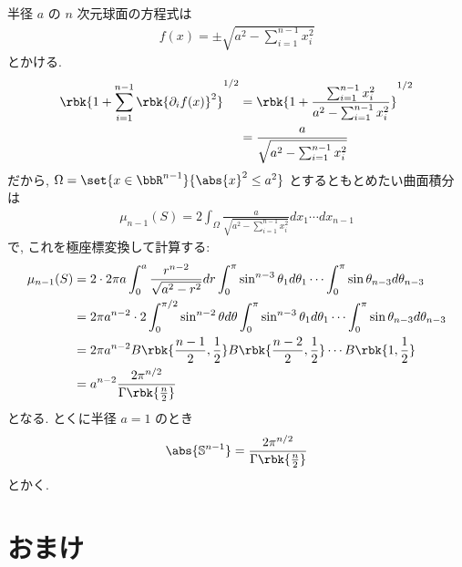 \documentclass[openany, a4paper, oneside]{jsbook}
\begin{document}
半径 $a$ の $n$ 次元球面の方程式は
\begin{align}
 f(x)
 =
 \pm \sqrt{a^2 - \sum_{i=1}^{n-1} x_i^2}
\end{align}
とかける.
\begin{align}
 \rbk{1 + \sum_{i=1}^{n-1} \rbk{\partial_if(x)}^2}^{1/2}
 &=
 \rbk{1 + \frac{\sum_{i=1}^{n-1}x_i^2}{a^2 - \sum_{i=1}^{n-1} x_i^2}}^{1/2} \\
 &=
 \frac{a}{\sqrt{a^2 - \sum_{i=1}^{n-1} x_i^2}}
\end{align}
だから, $\Omega = \set{x \in \bbR^{n-1}}{\abs{x}^2 \le a^2}$ とするともとめたい曲面積分は
\begin{align}
 \mu_{n-1}(S)
 =
 2\int_{\Omega}
  \frac{a}{\sqrt{a^2 - \sum_{i=1}^{n-1} x_i^2}} dx_1 \cdots dx_{n-1}
\end{align}
で, これを極座標変換して計算する:
\begin{align}
 \mu_{n-1}(S)
 &=
 2 \cdot 2\pi a\int_0^a\frac{r^{n-2}}{\sqrt{a^2 - r^2}} dr
 \int_0^{\pi}\sin^{n-3}\theta_1d\theta_1
  \cdots \int_0^{\pi}\sin\theta_{n-3}d\theta_{n-3} \\
 &=
 2\pi a^{n-2} \cdot 2\int_0^{\pi/2} \sin^{n-2}\theta d\theta
  \int_0^{\pi}\sin^{n-3}\theta_1d\theta_1
  \cdots \int_0^{\pi}\sin\theta_{n-3}d\theta_{n-3} \\
 &=
 2\pi a^{n-2}
  B \rbk{\frac{n-1}{2}, \frac{1}{2}} B \rbk{\frac{n-2}{2}, \frac{1}{2}}
   \cdots B \rbk{1, \frac{1}{2}} \\
 &=
 a^{n-2} \frac{2\pi^{n/2}}{\Gamma \rbk{\frac{n}{2}}}
\end{align}
となる.
とくに半径 $a=1$ のとき
\begin{align}
 \abs{\mathbb{S}^{n-1}}
 =
 \frac{2\pi^{n/2}}{\Gamma \rbk{\frac{n}{2}}}
\end{align}
とかく.
\section{おまけ}
\end{document}
